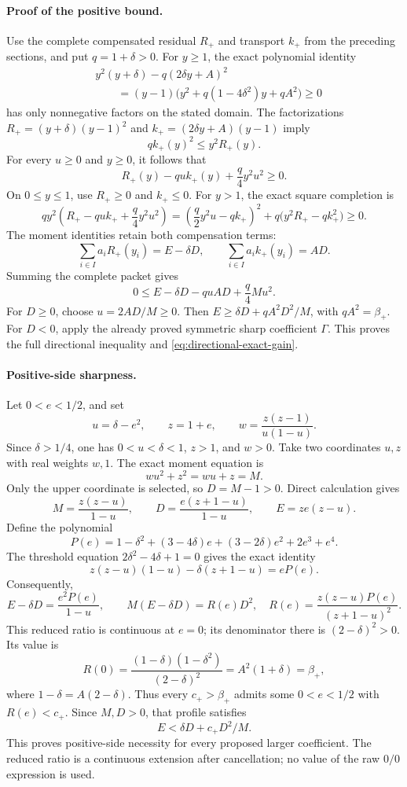 \paragraph{Proof of the positive bound.}
Use the complete compensated residual \(R_+\) and transport \(k_+\)
from the preceding sections, and put \(q=1+\delta>0\).
For \(y\ge1\), the exact polynomial identity
\[
 \begin{split}
 &y^2(y+\delta)-q(2\delta y+A)^2\\
 &\qquad=(y-1)\bigl(y^2+q(1-4\delta^2)y+qA^2\bigr)\ge0
 \end{split}
\]
has only nonnegative factors on the stated domain.
The factorizations
\(R_+=(y+\delta)(y-1)^2\) and
\(k_+=(2\delta y+A)(y-1)\) imply
\[
 q k_+(y)^2\le y^2R_+(y).
\]
For every \(u\ge0\) and \(y\ge0\), it follows that
\begin{equation}\label{eq:directional-positive-packet}
 R_+(y)-quk_+(y)+\frac q4 y^2u^2\ge0.
\end{equation}
On \(0\le y\le1\), use \(R_+\ge0\) and \(k_+\le0\).
For \(y>1\), the exact square completion is
\[
 qy^2\left(R_+-quk_++\frac q4 y^2u^2\right)
   =\left(\frac q2y^2u-qk_+\right)^2+
      q\bigl(y^2R_+-qk_+^2\bigr)\ge0.
\]
The moment identities retain both compensation terms:
\[
 \sum_{i\in I}a_iR_+(y_i)=E-\delta D,\qquad
 \sum_{i\in I}a_i k_+(y_i)=AD.
\]
Summing the complete packet gives
\[
 0\le E-\delta D-quAD+\frac q4Mu^2.
\]
For \(D\ge0\), choose \(u=2AD/M\ge0\).
Then \(E\ge\delta D+qA^2D^2/M\), with \(qA^2=\beta_+\).
For \(D<0\), apply the already proved symmetric sharp coefficient
\(\Gamma\).  This proves the full directional inequality and
\eqref{eq:directional-exact-gain}.

\paragraph{Positive-side sharpness.}
Let \(0<e<1/2\), and set
\[
 u=\delta-e^2,\qquad z=1+e,\qquad
 w=\frac{z(z-1)}{u(1-u)}.
\]
Since \(\delta>1/4\), one has \(0<u<\delta<1\), \(z>1\), and \(w>0\).
Take two coordinates \(u,z\) with real weights \(w,1\).
The exact moment equation is
\[
 wu^2+z^2=wu+z=M.
\]
Only the upper coordinate is selected, so \(D=M-1>0\).
Direct calculation gives
\[
 M=\frac{z(z-u)}{1-u},\qquad
 D=\frac{e(z+1-u)}{1-u},\qquad E=ze(z-u).
\]
Define the polynomial
\[
 P(e)=1-\delta^2+(3-4\delta)e+(3-2\delta)e^2+2e^3+e^4.
\]
The threshold equation \(2\delta^2-4\delta+1=0\) gives the exact identity
\[
 z(z-u)(1-u)-\delta(z+1-u)=eP(e).
\]
Consequently,
\[
 E-\delta D=\frac{e^2P(e)}{1-u},\qquad
 M(E-\delta D)=R(e)D^2,
 \quad
 R(e)=\frac{z(z-u)P(e)}{(z+1-u)^2}.
\]
This reduced ratio is continuous at \(e=0\); its denominator there is
\((2-\delta)^2>0\).  Its value is
\[
 R(0)=\frac{(1-\delta)(1-\delta^2)}{(2-\delta)^2}
      =A^2(1+\delta)=\beta_+,
\]
where \(1-\delta=A(2-\delta)\).
Thus every \(c_+>\beta_+\) admits some \(0<e<1/2\) with \(R(e)<c_+\).
Since \(M,D>0\), that profile satisfies
\[
 E<\delta D+c_+D^2/M.
\]
This proves positive-side necessity for every proposed larger coefficient.
The reduced ratio is a continuous extension after cancellation; no
value of the raw \(0/0\) expression is used.

